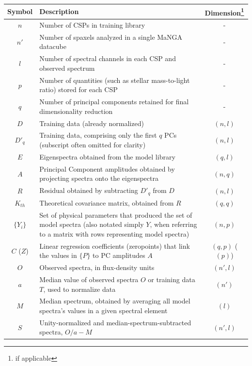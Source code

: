 \begin{table}
    \centering
    \begin{tabular}{||c|p{5in}|c||} \hline
        Symbol & Description & Dimension\footnote{if applicable}\\ \hline
        $n$ & Number of CSPs in training library & - \\ \hline
        $n'$ & Number of spaxels analyzed in a single MaNGA datacube & - \\ \hline
        $l$ & Number of spectral channels in each CSP and observed spectrum & - \\ \hline
        $p$ & Number of quantities (such as stellar mass-to-light ratio) stored for each CSP & - \\ \hline
        $q$ & Number of principal components retained for final dimensionality reduction & - \\ \hline
        $D$ & Training data (already normalized) & $(n,l)$ \\ \hline
        $D'_q$ & Training data, comprising only the first $q$ PCs (subscript often omitted for clarity) & $(n,l)$ \\ \hline
        $E$ & Eigenspectra obtained from the model library & $(q,l)$ \\ \hline
        $A$ & Principal Component amplitudes obtained by projecting spectra onto the eigenspectra & $(n,q)$ \\ \hline
        $R$ & Residual obtained by subtracting $D'_q$ from $D$ & $(n,l)$ \\ \hline
        $K_{th}$ & Theoretical covariance matrix, obtained from $R$ & $(q,q)$ \\ \hline
        $\{Y_i\}$ & Set of physical parameters that produced the set of model spectra (also notated simply $Y$, when referring to a matrix with rows representing model spectra) & $(n,p)$ \\ \hline
        $C$ ($Z$) & Linear regression coefficients (zeropoints) that link the values in $\{P\}$ to PC amplitudes $A$ & $(q,p)$ ($(p)$)\\ \hline
        $O$ & Observed spectra, in flux-density units & $(n',l)$ \\ \hline
        $a$ & Median value of observed spectra $O$ or training data $T$, used to normalize data & $(n')$ \\ \hline
        $M$ & Median spectrum, obtained by averaging all model spectra's values in a given spectral element & $(l)$ \\ \hline
        $S$ & Unity-normalized and median-spectrum-subtracted spectra, $O/a - M$ & $(n',l)$ \\ \hline

\end{tabular}
\end{table}
